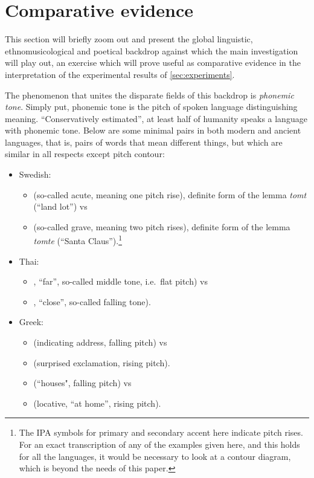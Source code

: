 \documentclass[twoside]{article}
\begin{document}
\section{Comparative evidence}\label{sec:comparative}

This section will briefly zoom out and present the global linguistic, ethnomusicological and poetical backdrop against which the main investigation will play out, an exercise which will prove useful as comparative evidence in the interpretation of the experimental results of \autoref{sec:experiments}.

The phenomenon that unites the disparate fields of this backdrop is \textit{phonemic tone}. Simply put, phonemic tone is the pitch of spoken language distinguishing meaning. ``Conservatively estimated'', at least half of humanity speaks a language with phonemic tone. \parencite[1]{schellenbergDoesLanguageDetermine2012} Below are some minimal pairs in both modern and ancient languages, that is, pairs of words that mean different things, but which are similar in all respects except pitch contour: 

\begin{itemize}
    \item Swedish:
    \begin{itemize}
        \item {} (so-called acute, meaning one pitch rise), definite form of the lemma \textit{tomt} (``land lot'') vs
        \item {} (so-called  grave, meaning two pitch rises), definite form of the lemma \textit{tomte} (``Santa Claus'').\footnote{The IPA symbols for primary and secondary accent here indicate pitch rises. For an exact transcription of any of the examples given here, and this holds for all the languages, it would be necessary to look at a contour diagram, which is beyond the needs of this paper.}
    \end{itemize}
    \item Thai:
    \begin{itemize}
        \item {}, ``far'', so-called middle tone, i.e.\ flat pitch) vs 
        \item {}, ``close'', so-called falling tone).
    \end{itemize}
    \item Greek:
    \begin{itemize}
        \item {} (indicating address, falling pitch) vs 
        \item {} (surprised exclamation, rising pitch).
        \item {} (``houses", falling pitch) vs
        \item {} (locative, ``at home'', rising pitch).
    \end{itemize}
\end{itemize}
\end{document}
